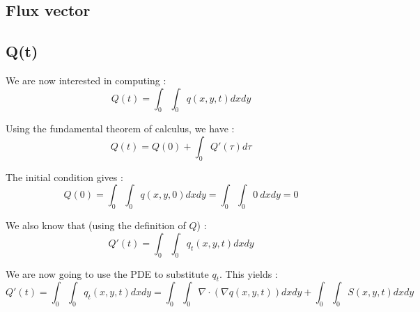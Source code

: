 \subsection{Flux vector}

\subsection{Q(t)}

We are now interested in computing : 
$$Q(t) = \int_0\int_0 q(x,y,t)dxdy$$

Using the fundamental theorem of calculus, we have :
$$Q(t) = Q(0) + \int_0 Q'(\tau)d\tau$$

The initial condition gives :
$$Q(0) =\int_0\int_0 q(x,y,0)dxdy = \int_0\int_0 0 \: dxdy = 0$$

We also know that (using the definition of $Q$) :
$$Q'(t) = \int_0\int_0 q_t(x,y,t)dxdy$$

We are now going to use the PDE to substitute $q_t$. This yields :
$$Q'(t) = \int_0\int_0 q_t(x,y,t)dxdy = \int_0\int_0 \nabla \cdot (\nabla q(x,y,t))dxdy+\int_0\int_0 S(x,y,t) dxdy$$